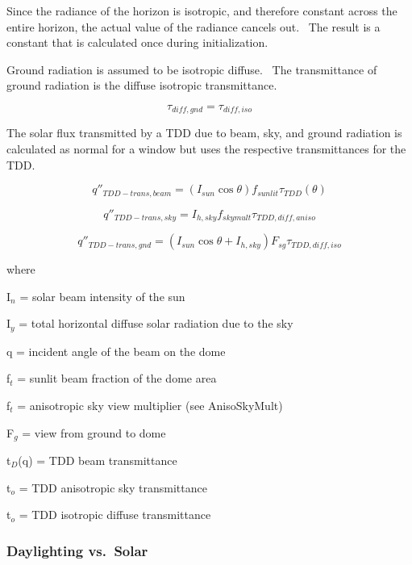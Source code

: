Since the radiance of the horizon is isotropic, and therefore constant across the entire horizon, the actual value of the radiance cancels out.~ The result is a constant that is calculated once during initialization.

Ground radiation is assumed to be isotropic diffuse.~ The transmittance of ground radiation is the diffuse isotropic transmittance.

\begin{equation}
{\tau_{diff,gnd}} = {\tau_{diff,iso}}
\end{equation}

The solar flux transmitted by a TDD due to beam, sky, and ground radiation is calculated as normal for a window but uses the respective transmittances for the TDD.

\begin{equation}
{q''_{TDD - trans,beam}} = \left( {{I_{sun}}\cos \theta } \right){f_{sunlit}}{\tau_{TDD}}(\theta )
\end{equation}

\begin{equation}
{q''_{TDD - trans,sky}} = {I_{h,sky}}{f_{skymult}}{\tau_{TDD,diff,aniso}}
\end{equation}

\begin{equation}
{q''_{TDD - trans,gnd}} = \left( {{I_{sun}}\cos \theta  + {I_{h,sky}}} \right){F_{sg}}{\tau_{TDD,diff,iso}}
\end{equation}

where

I\(_{n}\) = solar beam intensity of the sun

I\(_{y}\) = total horizontal diffuse solar radiation due to the sky

q = incident angle of the beam on the dome

f\(_{t}\) = sunlit beam fraction of the dome area

f\(_{t}\) = anisotropic sky view multiplier (see AnisoSkyMult)

F\(_{g}\) = view from ground to dome

t\(_{D}\)(q) = TDD beam transmittance

t\(_{o}\) = TDD anisotropic sky transmittance

t\(_{o}\) = TDD isotropic diffuse transmittance

\subsubsection{Daylighting vs.~Solar}\label{daylighting-vs.solar}

